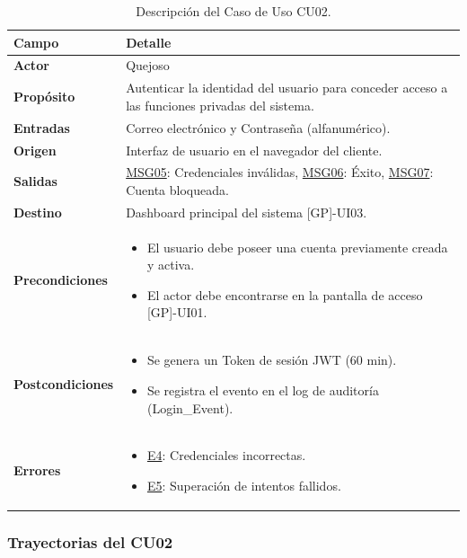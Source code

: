 \begin{appendices}
\begin{table}[htbp]
\centering
\small
\begin{tabular}{|p{3.5cm}|p{10.5cm}|}
\hline
\rowcolor[HTML]{EFEFEF} 
\textbf{Campo} & \textbf{Detalle} \\ \hline
\textbf{Actor} & Quejoso \\ \hline
\textbf{Propósito} & Autenticar la identidad del usuario para conceder acceso a las funciones privadas del sistema. \\ \hline
\textbf{Entradas} & Correo electrónico y Contraseña (alfanumérico). \\ \hline
\textbf{Origen} & Interfaz de usuario en el navegador del cliente. \\ \hline
\textbf{Salidas} & \hyperlink{msg:MSG05}{MSG05}: Credenciales inválidas, \hyperlink{msg:MSG06}{MSG06}: Éxito, \hyperlink{msg:MSG07}{MSG07}: Cuenta bloqueada. \\ \hline
\textbf{Destino} & Dashboard principal del sistema [GP]-UI03. \\ \hline
\textbf{Precondiciones} & 
\begin{itemize}[nosep, leftmargin=*]
    \item El usuario debe poseer una cuenta previamente creada y activa.
    \item El actor debe encontrarse en la pantalla de acceso [GP]-UI01.
\end{itemize} \\ \hline
\textbf{Postcondiciones} & 
\begin{itemize}[nosep, leftmargin=*]
    \item Se genera un Token de sesión JWT (60 min).
    \item Se registra el evento en el log de auditoría (Login\_Event).
\end{itemize} \\ \hline
\textbf{Errores} & 
\begin{itemize}[nosep, leftmargin=*]
    \item \hyperlink{err:E4}{E4}: Credenciales incorrectas.
    \item \hyperlink{err:E5}{E5}: Superación de intentos fallidos.
\end{itemize} \\ \hline
\end{tabular}
\caption{Descripción del Caso de Uso CU02.}
\label{tab:cu02_especificacion}
\end{table}

\subsubsection{Trayectorias del CU02}


\end{appendices}

